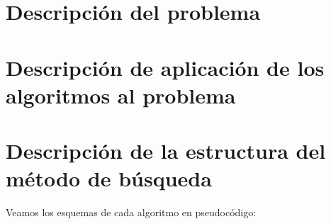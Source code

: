 \documentclass[a4paper, 11pt]{article}
\begin{document}
  \maketitle
  \tableofcontents
  \newpage

  \section{Descripción del problema}

    

  \section{Descripción de aplicación de los algoritmos al problema}
    
  \section{Descripción de la estructura del método de búsqueda}
    Veamos los esquemas de cada algoritmo en pseudocódigo:
\end{document}
